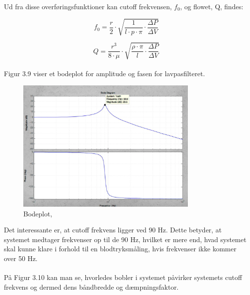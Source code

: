 Ud fra disse overføringsfunktioner kan cutoff frekvensen, $f_{0}$, og flowet, Q, findes:

\begin{equation}
f_{0} = \frac{r}{2} \cdot \sqrt{\frac{1}{l\cdot p \cdot \pi}\cdot \frac{\Delta P}{\Delta V}}
\end{equation}

\begin{equation}
Q = \frac{r^3}{8 \cdot \mu} \cdot \sqrt{\frac{\rho \cdot \pi}{l}\cdot \frac{\Delta P}{\Delta V}}
\end{equation}
 \\
 
Figur 3.9 viser et bodeplot for amplitude og fasen for lavpasfilteret.

\begin{figure}[H]
	\centering
	\includegraphics[width=0.8\textwidth]{Figurer/Snip20151207_61}
	\caption{Bodeplot, \protect\cite[slide 18]{Diashow}}
\end{figure}

Det interessante er, at cutoff frekvens ligger ved 90 Hz. Dette betyder, at systemet medtager frekvenser op til de 90 Hz, hvilket er mere end, hvad systemet skal kunne klare i forhold til en blodtryksmåling, hvis frekvenser ikke kommer over 50 Hz.
\\\\ 

På Figur 3.10 kan man se, hvorledes bobler i systemet påvirker systemets cutoff frekvens og dermed dens båndbredde og dæmpningsfaktor.   

